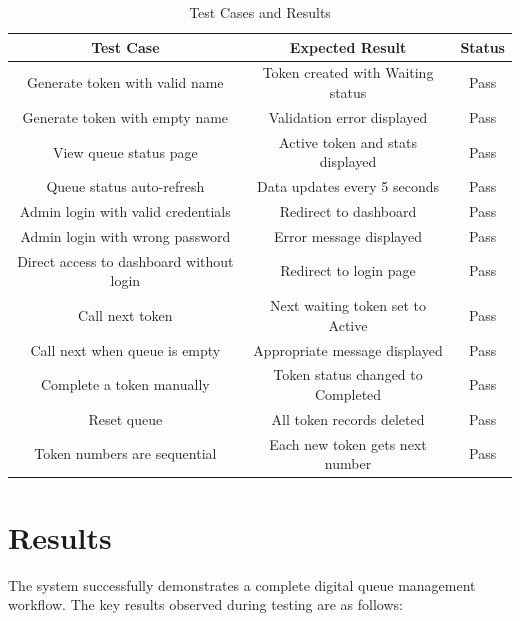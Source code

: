 \begin{table}[htbp]
    \centering
    \begin{tabular}{|c|c|c|}
        \hline
        \textbf{Test Case} & \textbf{Expected Result} & \textbf{Status} \\
        \hline
        Generate token with valid name & Token created with Waiting status & Pass \\
        \hline
        Generate token with empty name & Validation error displayed & Pass \\
        \hline
        View queue status page & Active token and stats displayed & Pass \\
        \hline
        Queue status auto-refresh & Data updates every 5 seconds & Pass \\
        \hline
        Admin login with valid credentials & Redirect to dashboard & Pass \\
        \hline
        Admin login with wrong password & Error message displayed & Pass \\
        \hline
        Direct access to dashboard without login & Redirect to login page & Pass \\
        \hline
        Call next token & Next waiting token set to Active & Pass \\
        \hline
        Call next when queue is empty & Appropriate message displayed & Pass \\
        \hline
        Complete a token manually & Token status changed to Completed & Pass \\
        \hline
        Reset queue & All token records deleted & Pass \\
        \hline
        Token numbers are sequential & Each new token gets next number & Pass \\
        \hline
    \end{tabular}
    \caption{Test Cases and Results}
    \label{tab:testcases}
\end{table}

\section{Results}

The system successfully demonstrates a complete digital queue management workflow. The key results observed during testing are as follows:

